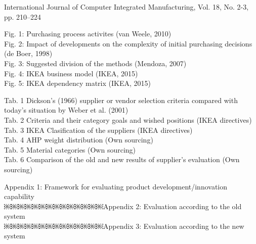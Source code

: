 \documentclass[oneside,12pt]{article}%
\begin{document}
\begin{literatura}
{International Journal of Computer Integrated Manufacturing, Vol. 18, No. 2-3, pp. 210–224}


\end{literatura}


Fig. 1: Purchasing process activites (van Weele, 2010)\\
Fig. 2: Impact of developments on the complexity of initial purchasing decisions (de
Boer, 1998)\\
Fig. 3: Suggested division of the methods (Mendoza, 2007)\\
Fig. 4: IKEA business model (IKEA, 2015)\\
Fig. 5: IKEA dependency matrix (IKEA, 2015)


Tab. 1  Dickson's (1966) supplier or vendor selection criteria compared with today's situation by Weber et al. (2001) \\
Tab. 2 Criteria and their category goals and wished positions (IKEA directives)\\
Tab. 3 IKEA Clasification of the suppliers (IKEA directives)\\
Tab. 4  AHP weight distribution (Own sourcing)\\
Tab. 5  Material categories (Own sourcing)\\
Tab. 6 Comparison of the old and new results of supplier's evaluation (Own sourcing)



Appendix 1: Framework for evaluating product development/innovation capability \\
￼￼￼￼￼￼￼￼￼￼￼￼￼￼Appendix 2: Evaluation according to the old system\\
￼￼￼￼￼￼￼￼￼￼￼￼￼￼Appendix 3: Evaluation according to the new system\\
\end{document}
